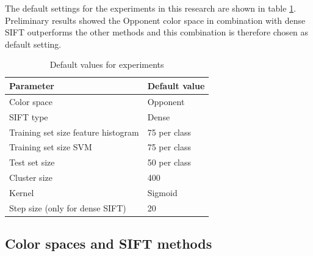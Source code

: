The default settings for the experiments in this research are shown in table \ref{tab:default}. Preliminary results showed the Opponent color space in combination with dense SIFT outperforms the other methods and this combination is therefore chosen as default setting.

\begin{table}[H]
\begin{tabular}{|l|l|}
\hline
\textbf{Parameter} & \textbf{Default value}\\
\hline
Color space & Opponent\\
SIFT type & Dense\\
Training set size feature histogram & 75 per class\\
Training set size SVM & 75 per class\\
Test set size & 50 per class \\
Cluster size & 400 \\
Kernel & Sigmoid \\
Step size (only for dense SIFT) & 20\\
\hline
\end{tabular}
\caption{Default values for experiments}
\label{tab:default}
\end{table}

\subsection{Color spaces and SIFT methods}


